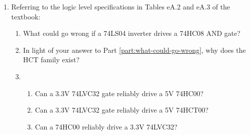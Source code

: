 \documentclass{e85}
\begin{document}
\begin{enumerate}
\begin{center}
\begin{tikzpicture}[
        drop/.style={
          densely dotted,
          thick,
        },]
    \end{tikzpicture}
  \end{center}

  \begin{solution}

  \end{solution}

\item Referring to the logic level specifications in Tables eA.2 and
  eA.3 of the textbook:
  \begin{enumerate}
  \item \label{part:what-could-go-wrong} What could go wrong if a
    74LS04 inverter drives a 74HC08 AND gate?

    \begin{solution}

    \end{solution}

  \item In light of your answer to Part
    \ref{part:what-could-go-wrong}, why does the HCT family exist?

    \begin{solution}

    \end{solution}

  \item
    \begin{enumerate}
    \item Can a 3.3V 74LVC32 gate reliably drive a 5V 74HC00?

      \begin{solution}

      \end{solution}

    \item Can a 3.3V 74LVC32 gate reliably drive a 5V 74HCT00?

      \begin{solution}

      \end{solution}

    \item Can a 74HC00 reliably drive a 3.3V 74LVC32?

      \begin{solution}

      \end{solution}
    \end{enumerate}
  \end{enumerate}


\end{enumerate}
\end{document}
